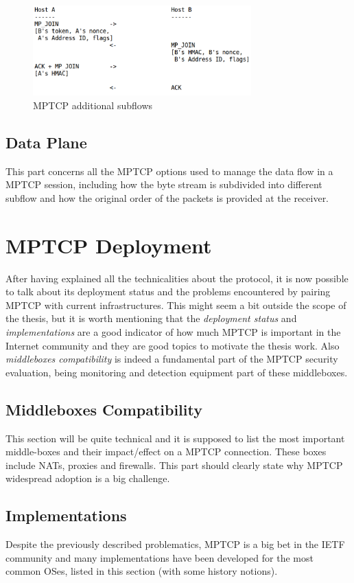 \begin{figure}[!htb]
\centering
\includegraphics[width=0.75\textwidth]{images/mpjoin}
\caption{MPTCP additional subflows}
\label{fig:mpjoin}
\end{figure}

\subsection{Data Plane}
This part concerns all the MPTCP options used to manage the data flow in a MPTCP session, including how the byte stream is subdivided into different subflow and how the original order of the packets is provided at the receiver.

\section{MPTCP Deployment}
After having explained all the technicalities about the protocol, it is now possible to talk about its deployment status and the problems encountered by pairing MPTCP with current infrastructures. This might seem a bit outside the scope of the thesis, but it is worth mentioning that the \textit{deployment status} and \textit{implementations} are a good indicator of how much MPTCP is important in the Internet community and they are good topics to motivate the thesis work. Also \textit{middleboxes compatibility} is indeed a fundamental part of the MPTCP security evaluation, being monitoring and detection equipment part of these middleboxes.

\subsection{Middleboxes Compatibility}
This section will be quite technical and it is supposed to list the most important middle-boxes and their impact/effect on a MPTCP connection. These boxes include NATs, proxies and firewalls. This part should clearly state why MPTCP widespread adoption is a big challenge.

\subsection{Implementations}
Despite the previously described problematics, MPTCP is a big bet in the IETF community and many implementations have been developed for the most common OSes, listed in this section (with some history notions).

